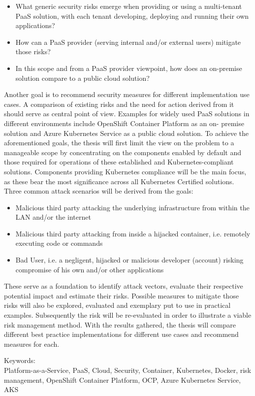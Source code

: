 \begin{itemize}

\item What generic security risks emerge when providing or using a multi-tenant PaaS solution,
with each tenant developing, deploying and running their own applications? 

\item How can a PaaS provider (serving internal and/or external users) mitigate those risks? 

\item  In this scope and from a PaaS provider viewpoint, how does an on-premise solution compare
to a public cloud solution? 

\end{itemize}

Another goal is to recommend security measures for different implementation use cases.
A comparison of existing risks and the need for action derived from it should serve as central point of view.
Examples for widely used PaaS solutions in different environments include OpenShift Container Platform 
as an on- premise solution and Azure Kubernetes Service as a public cloud solution.
To achieve the aforementioned goals, the thesis will first limit the view on the problem to a manageable scope by
concentrating on the components enabled by default and those required for operations of these established and Kubernetes-compliant solutions.
Components providing Kubernetes compliance will be the main focus, as these bear the most significance across all Kubernetes Certified solutions. 
Three common attack scenarios will be derived from the goals:

\begin{itemize}

\item Malicious third party attacking the underlying infrastructure from within the LAN and/or the
internet

\item Malicious third party attacking from inside a hijacked container, i.e. remotely executing code
or commands

\item Bad User, i.e. a negligent, hijacked or malicious developer (account) risking compromise of
his own and/or other applications

\end{itemize}

These serve as a foundation to identify attack vectors, evaluate their respective potential impact and estimate their risks.
Possible measures to mitigate those risks will also be explored, evaluated and exemplary put to use in practical examples.
Subsequently the risk will be re-evaluated in order to illustrate a viable risk management method.
With the results gathered, the thesis will compare different best practice implementations for different use cases and recommend measures for each.


\bigskip

\noindent
Keywords: \\
Platform-as-a-Service, PaaS, Cloud, Security, Container, Kubernetes, Docker, risk management, OpenShift Container Platform, OCP, Azure Kubernetes Service, AKS

